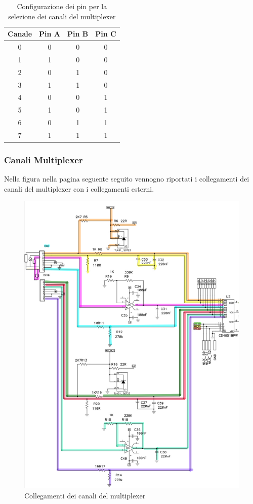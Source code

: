 \documentclass[12pt,a4paper]{report}
\begin{document}
\begin{table}[H]
    \centering
    \begin{tabular}{|c|c|c|c|}
        \hline
        \textbf{Canale} & \textbf{Pin A} & \textbf{Pin B} & \textbf{Pin C} \\ \hline
        0 & 0 & 0 & 0 \\ \hline
        1 & 1 & 0 & 0 \\ \hline
        2 & 0 & 1 & 0 \\ \hline
        3 & 1 & 1 & 0 \\ \hline
        4 & 0 & 0 & 1 \\ \hline
        5 & 1 & 0 & 1 \\ \hline
        6 & 0 & 1 & 1 \\ \hline
        7 & 1 & 1 & 1 \\ \hline
    \end{tabular}
    \caption{Configurazione dei pin per la selezione dei canali del multiplexer}
\end{table}

\subsubsection{Canali Multiplexer}
Nella figura nella pagina seguente seguito vennogno riportati i collegamenti dei canali del multiplexer con i collegamenti esterni. 

\begin{figure}[H]
    \centering
    \includegraphics[width=\linewidth]{../image/channelMultiplex.png}
    \caption{Collegamenti dei canali del multiplexer}
\end{figure}
\end{document}
